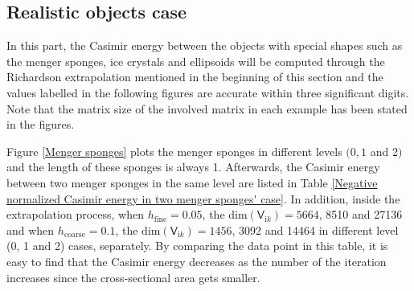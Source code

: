 \subsection{Realistic objects case}
In this part, the Casimir energy between the objects with special shapes such as the menger sponges, ice crystals and ellipsoids will be computed 
through the Richardson extrapolation mentioned in the beginning of this section and the values labelled in the following figures are accurate within three significant digits. 
Note that the matrix size of the involved matrix in each example has been stated in the figures.

Figure \ref{Menger sponges} plots the menger sponges in different levels $(0, 1 $ and $ 2)$ and the length of these sponges is always 1. Afterwards, the Casimir 
energy between two menger sponges in the same level are listed in Table \ref{Negative normalized Casimir energy in two menger sponges' case}. 
In addition, inside the extrapolation process, when $h_{\text{fine}} = 0.05$, the $\text{dim}(\mathsf{V}_{\mathrm{i}k}) = 5664$, 8510 and 27136 and 
when $h_{\text{coarse}} = 0.1$, the $\text{dim}(\mathsf{V}_{\mathrm{i}k}) = 1456$, 3092 and 14464 in different level (0, 1 and 2) cases, separately. 
By comparing the data 
point in this table, it is easy to find that the Casimir energy decreases as the number of the iteration increases since the cross-sectional 
area gets smaller.

